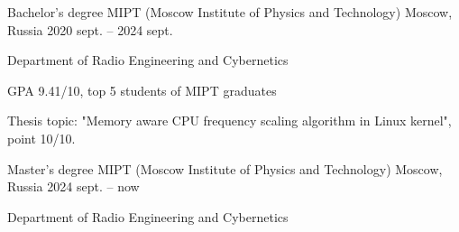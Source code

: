 
\begin{cventries}

  \cventry
    {Bachelor's degree} %
    {MIPT (Moscow Institute of Physics and Technology)} %
    {Moscow, Russia} %
    {2020 sept. -- 2024 sept.} %
    {
      \begin{cvitems} %
        \item {Department of Radio Engineering and Cybernetics}
        \item {GPA 9.41/10, top 5 students of MIPT graduates}
        \item Thesis topic: "Memory aware CPU frequency scaling algorithm in Linux kernel", point 10/10.
      \end{cvitems}
      \vspace{2mm}
    }

  \cventry
    {Master's degree} %
    {MIPT (Moscow Institute of Physics and Technology)} %
    {Moscow, Russia} %
    {2024 sept. -- now} %
    {
      \begin{cvitems} %
        \item {Department of Radio Engineering and Cybernetics}
      \end{cvitems}
    }

\end{cventries}
